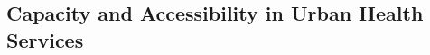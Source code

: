 \documentclass[pdflatex,sn-mathphys-num]{sn-jnl}%
\newcommand\redb[1]{#1}
\theoremstyle{thmstyleone}%
\theoremstyle{thmstyletwo}%
\theoremstyle{thmstylethree}%
\begin{document}

\subsection{Capacity and Accessibility in Urban Health Services}
\label{related:health_services}
\end{document}
